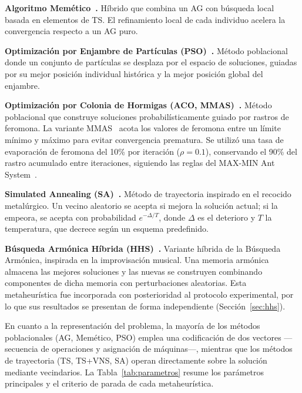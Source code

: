\documentclass[conference]{IEEEtran}
\begin{document}
\textbf{Algoritmo Mem\'etico~\cite{moscato1989}.}
H\'ibrido que combina un AG con b\'usqueda local basada en
elementos de TS. El refinamiento local de cada individuo acelera
la convergencia respecto a un AG puro.

\textbf{Optimizaci\'on por Enjambre de Part\'iculas
(PSO)~\cite{kennedy1995}.}
M\'etodo poblacional donde un conjunto de part\'iculas se desplaza
por el espacio de soluciones, guiadas por su mejor posici\'on
individual hist\'orica y la mejor posici\'on global del enjambre.

\textbf{Optimizaci\'on por Colonia de Hormigas (ACO,
MMAS)~\cite{dorigo1996,stutzle2000}.}
M\'etodo poblacional que construye soluciones probabil\'isticamente
guiado por rastros de feromona. La variante MMAS~\cite{stutzle2000}
acota los valores de feromona entre un l\'imite m\'inimo y m\'aximo
para evitar convergencia prematura.
Se utiliz\'o una tasa de evaporaci\'on de feromona del 10\% por
iteraci\'on ($\rho = 0.1$), conservando el 90\% del rastro
acumulado entre iteraciones, siguiendo las reglas del MAX-MIN Ant
System~\cite{stutzle2000}.

\textbf{Simulated Annealing (SA)~\cite{kirkpatrick1983}.}
M\'etodo de trayectoria inspirado en el recocido metal\'urgico.
Un vecino aleatorio se acepta si mejora la soluci\'on actual; si la
empeora, se acepta con probabilidad $e^{-\Delta/T}$, donde $\Delta$
es el deterioro y $T$ la temperatura, que decrece seg\'un un esquema
predefinido.

\textbf{B\'usqueda Arm\'onica H\'ibrida (HHS)~\cite{mahdavi2007}.}
Variante h\'ibrida de la B\'usqueda Arm\'onica, inspirada en la
improvisaci\'on musical. Una memoria arm\'onica almacena las mejores
soluciones y las nuevas se construyen combinando componentes de
dicha memoria con perturbaciones aleatorias. Esta metaheur\'istica
fue incorporada con posterioridad al protocolo experimental, por lo
que sus resultados se presentan de forma independiente
(Secci\'on~\ref{sec:hhs}).

En cuanto a la representaci\'on del problema, la mayor\'ia de los
m\'etodos poblacionales (AG, Mem\'etico, PSO) emplea una codificaci\'on
de dos vectores ---secuencia de operaciones y asignaci\'on de
m\'aquinas---, mientras que los m\'etodos de trayectoria (TS, TS+VNS,
SA) operan directamente sobre la soluci\'on mediante vecindarios.
La Tabla~\ref{tab:parametros} resume los par\'ametros principales y el
criterio de parada de cada metaheur\'istica.
\end{document}
